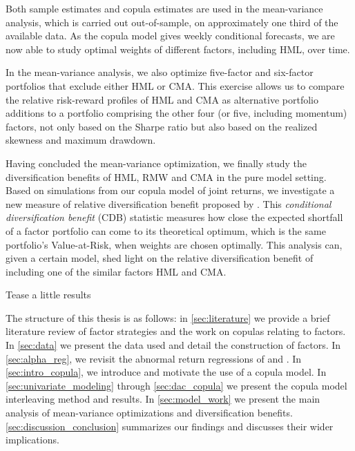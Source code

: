 Both sample estimates and copula estimates are used in the mean-variance analysis, which is carried out out-of-sample, on approximately one third of the available data. As the copula model gives weekly conditional forecasts, we are now able to study optimal weights of different factors, including HML, over time. 

In the mean-variance analysis, we also optimize five-factor and six-factor portfolios that exclude either HML or CMA. This exercise allows us to compare the relative risk-reward profiles of HML and CMA as alternative portfolio additions to a portfolio comprising the other four (or five, including momentum) factors, not only based on the Sharpe ratio but also based on the realized skewness and maximum drawdown. 

Having concluded the mean-variance optimization, we finally study the diversification benefits of HML, RMW and CMA in the pure model setting. Based on simulations from our copula model of joint returns, we investigate a new measure of relative diversification benefit proposed by \textcite{ChristoffersenErrunzaJacobLanglois2012}. This \emph{conditional diversification benefit} (CDB) statistic measures how close the expected shortfall of a factor portfolio can come to its theoretical optimum, which is the same portfolio's Value-at-Risk, when weights are chosen optimally. This analysis can, given a certain model, shed light on the relative diversification benefit of including one of the similar factors HML and CMA.

Tease a little results
 
The structure of this thesis is as follows: in \autoref{sec:literature} we provide a brief literature review of factor strategies and the work on copulas relating to factors. In \autoref{sec:data} we present the data used and detail the construction of factors. In \autoref{sec:alpha_reg}, we revisit the abnormal return regressions of \textcite{FF2015} and \textcite{Asness2015}. In \autoref{sec:intro_copula}, we introduce and motivate the use of a copula model. In \autoref{sec:univariate_modeling} through \autoref{sec:dac_copula} we present the copula model interleaving method and results. In \autoref{sec:model_work} we present the main analysis of mean-variance optimizations and diversification benefits. \autoref{sec:discussion_conclusion} summarizes our findings and discusses their wider implications.